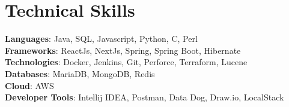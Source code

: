 \documentclass[letterpaper,11pt]{article}
\begin{document}
%
\section{Technical Skills}
\begin{itemize}[leftmargin=0.01in, label={}]
	\small{\item{
		\textbf{Languages}{: Java, SQL, Javascript, Python, C, Perl} \\
		\textbf{Frameworks}{: ReactJs, NextJs, Spring, Spring Boot, Hibernate} \\
		\textbf{Technologies}{: Docker, Jenkins, Git, Perforce, Terraform, Lucene} \\
		\textbf{Databases}{: MariaDB, MongoDB, Redis } \\
		\textbf{Cloud}{: AWS} \\
		\textbf{Developer Tools}{: Intellij IDEA, Postman, Data Dog, Draw.io, LocalStack} \\
	}}
\end{itemize}
\vspace{-16pt}

\end{document}
